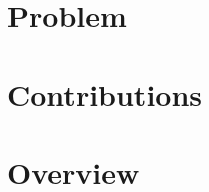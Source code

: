 \documentclass[../main.tex]{subfiles}
\begin{document}
\section{Problem}


\section{Contributions}


\section{Overview}
\end{document}
